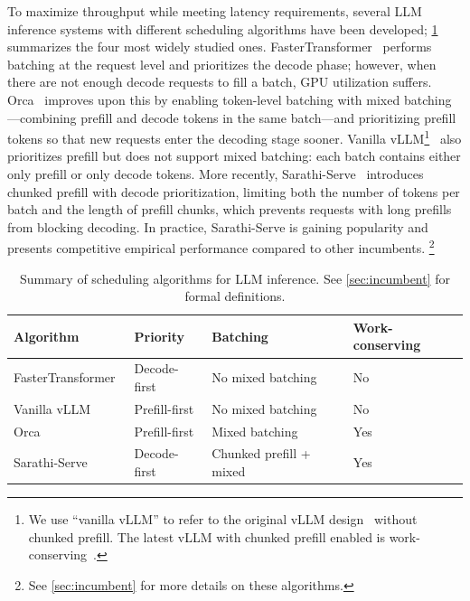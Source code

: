 \documentclass[11pt]{article}
\theoremstyle{plain}
\theoremstyle{definition}
\theoremstyle{remark}
\begin{document}
To maximize throughput while meeting latency requirements, several LLM inference systems with different scheduling algorithms have been developed; \cref{tab:scheduling-algorithms} summarizes the four most widely studied ones. FasterTransformer~\citep{fastertransformer} performs batching at the request level and prioritizes the decode phase; however, when there are not enough decode requests to fill a batch, GPU utilization suffers. Orca~\citep{yu2022orca} improves upon this by enabling token-level batching with mixed batching---combining prefill and decode tokens in the same batch---and prioritizing prefill tokens so that new requests enter the decoding stage sooner. Vanilla vLLM\footnote{We use ``vanilla vLLM'' to refer to the original vLLM design~\citep{kwon2023efficient} without chunked prefill. The latest vLLM with chunked prefill enabled is work-conserving~\citep{vllm2025chunked}.}~\citep{kwon2023efficient} also prioritizes prefill but does not support mixed batching: each batch contains either only prefill or only decode tokens. More recently, Sarathi-Serve~\citep{agrawal2023sarathi} introduces chunked prefill with decode prioritization, limiting both the number of tokens per batch and the length of prefill chunks, which prevents requests with long prefills from blocking decoding. In practice, Sarathi-Serve is gaining popularity and presents competitive empirical performance compared to other incumbents. \footnote{See \cref{sec:incumbent} for more details on these algorithms.} 

\begin{table}[ht]
\centering
\caption{Summary of scheduling algorithms for LLM inference. See \cref{sec:incumbent} for formal definitions.}
\label{tab:scheduling-algorithms}
\small
\begin{tabular}{llll}
\toprule
Algorithm & Priority & Batching & Work-conserving \\
\midrule
FasterTransformer~\citep{fastertransformer} & Decode-first & No mixed batching & No \\
Vanilla vLLM~\citep{kwon2023efficient} & Prefill-first & No mixed batching & No \\
Orca~\citep{yu2022orca} & Prefill-first & Mixed batching & Yes \\
Sarathi-Serve~\citep{agrawal2023sarathi} & Decode-first & Chunked prefill + mixed & Yes \\
\bottomrule
\end{tabular}
\end{table}
\end{document}
